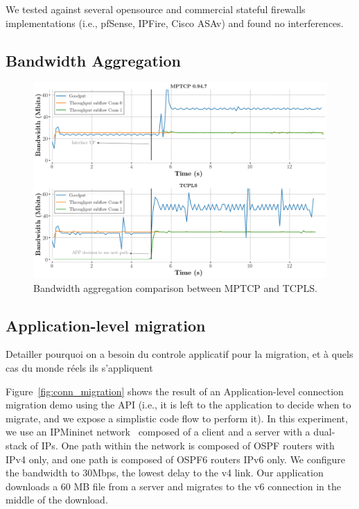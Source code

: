 We tested \tcpls against several opensource and commercial stateful firewalls
implementations (i.e., pfSense, IPFire, Cisco ASAv) and found no interferences.

\subsection{Bandwidth Aggregation}

\begin{figure}[!t] \begin{center}
    \includegraphics[width=\columnwidth]{figures/aggregate_dual.png}
  \end{center} \caption{Bandwidth aggregation comparison between MPTCP and
    TCPLS.} \end{figure}

\subsection{Application-level migration}

Detailler pourquoi on a besoin du controle applicatif pour la migration, et à
quels cas du monde réels ils s'appliquent


Figure~\ref{fig:conn_migration} shows the result of an Application-level
connection migration demo using the API (i.e., it is left to the
application to decide when to migrate, and we expose a simplistic code flow to
perform it). In this experiment, we use an IPMininet network~\cite{ipmininet, jadin2020educational}
composed of a client and a server with a dual-stack of IPs. One path within the
network is composed of OSPF routers with IPv4 only, and one path is composed of
OSPF6 routers IPv6 only. We configure the bandwidth to 30Mbps, the lowest delay
to the v4 link. Our application
downloads a 60 MB file from a server and migrates to the v6 connection in
the middle of the download.

